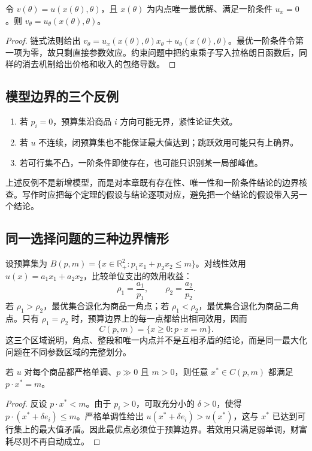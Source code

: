 \begin{proposition}[包络公式的直接证明]
令 $v(\theta)=u(x(\theta),\theta)$，且 $x(\theta)$ 为内点唯一最优解、满足一阶条件 $u_x=0$。则
$v_{\theta}=u_{\theta}(x(\theta),\theta)$。
\end{proposition}
\begin{proof}
链式法则给出 $v_{\theta}=u_x(x(\theta),\theta)x_{\theta}+u_{\theta}(x(\theta),\theta)$。最优一阶条件令第一项为零，故只剩直接参数效应。约束问题中把约束乘子写入拉格朗日函数后，同样的消去机制给出价格和收入的包络导数。
\end{proof}

\subsection{模型边界的三个反例}
\begin{enumerate}
\item 若 $p_i=0$，预算集沿商品 $i$ 方向可能无界，紧性论证失效。
\item 若 $u$ 不连续，闭预算集也不能保证最大值达到；跳跃效用可能只有上确界。
\item 若可行集不凸，一阶条件即使存在，也可能只识别某一局部峰值。
\end{enumerate}
上述反例不是新增模型，而是对本章既有存在性、唯一性和一阶条件结论的边界核查。写作时应把每个定理的假设与结论逐项对应，避免把一个结论的假设带入另一个结论。

\subsection{同一选择问题的三种边界情形}
设预算集为 $B(p,m)=\{x\in\mathbb R_+^2:p_1x_1+p_2x_2\le m\}$。对线性效用
$u(x)=a_1x_1+a_2x_2$，比较单位支出的效用收益：
\[
\rho_1=\frac{a_1}{p_1},\qquad \rho_2=\frac{a_2}{p_2}.
\]
若 $\rho_1>\rho_2$，最优集合退化为商品一角点；若 $\rho_1<\rho_2$，最优集合退化为商品二角点。只有 $\rho_1=\rho_2$ 时，预算边界上的每一点都给出相同效用，因而
\[
C(p,m)=\{x\ge0:p\cdot x=m\}.
\]
这三个区域说明，角点、整段和唯一内点并不是互相矛盾的结论，而是同一最大化问题在不同参数区域的完整划分。

\begin{proposition}[财富耗尽的条件]
若 $u$ 对每个商品都严格单调、$p\gg0$ 且 $m>0$，则任意 $x^*\in C(p,m)$ 都满足 $p\cdot x^*=m$。
\end{proposition}
\begin{proof}
反设 $p\cdot x^*<m$。由于 $p_i>0$，可取充分小的 $\delta>0$，使得
$p\cdot(x^*+\delta e_i)\le m$。严格单调性给出
$u(x^*+\delta e_i)>u(x^*)$，这与 $x^*$ 已达到可行集上的最大值矛盾。因此最优点必须位于预算边界。若效用只满足弱单调，财富耗尽则不再自动成立。
\end{proof}

